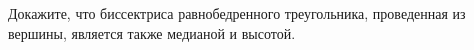Докажите, что биссектриса равнобедренного треугольника, проведенная из вершины, является также медианой
и высотой.